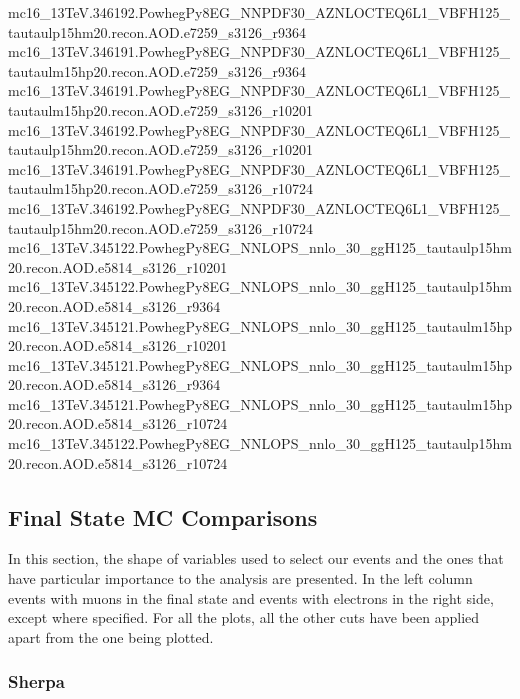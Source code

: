 {mc16\_13TeV.346192.PowhegPy8EG\_NNPDF30\_AZNLOCTEQ6L1\_VBFH125\_tautaulp15hm20.recon.AOD.e7259\_s3126\_r9364\newline  
mc16\_13TeV.346191.PowhegPy8EG\_NNPDF30\_AZNLOCTEQ6L1\_VBFH125\_tautaulm15hp20.recon.AOD.e7259\_s3126\_r9364\newline  
mc16\_13TeV.346191.PowhegPy8EG\_NNPDF30\_AZNLOCTEQ6L1\_VBFH125\_tautaulm15hp20.recon.AOD.e7259\_s3126\_r10201\newline  
mc16\_13TeV.346192.PowhegPy8EG\_NNPDF30\_AZNLOCTEQ6L1\_VBFH125\_tautaulp15hm20.recon.AOD.e7259\_s3126\_r10201\newline  
mc16\_13TeV.346191.PowhegPy8EG\_NNPDF30\_AZNLOCTEQ6L1\_VBFH125\_tautaulm15hp20.recon.AOD.e7259\_s3126\_r10724\newline  
mc16\_13TeV.346192.PowhegPy8EG\_NNPDF30\_AZNLOCTEQ6L1\_VBFH125\_tautaulp15hm20.recon.AOD.e7259\_s3126\_r10724\newline  
mc16\_13TeV.345122.PowhegPy8EG\_NNLOPS\_nnlo\_30\_ggH125\_tautaulp15hm20.recon.AOD.e5814\_s3126\_r10201\newline  
mc16\_13TeV.345122.PowhegPy8EG\_NNLOPS\_nnlo\_30\_ggH125\_tautaulp15hm20.recon.AOD.e5814\_s3126\_r9364\newline  
mc16\_13TeV.345121.PowhegPy8EG\_NNLOPS\_nnlo\_30\_ggH125\_tautaulm15hp20.recon.AOD.e5814\_s3126\_r10201\newline  
mc16\_13TeV.345121.PowhegPy8EG\_NNLOPS\_nnlo\_30\_ggH125\_tautaulm15hp20.recon.AOD.e5814\_s3126\_r9364\newline  
mc16\_13TeV.345121.PowhegPy8EG\_NNLOPS\_nnlo\_30\_ggH125\_tautaulm15hp20.recon.AOD.e5814\_s3126\_r10724\newline  
mc16\_13TeV.345122.PowhegPy8EG\_NNLOPS\_nnlo\_30\_ggH125\_tautaulp15hm20.recon.AOD.e5814\_s3126\_r10724}	

\clearpage
\subsection{Final State MC Comparisons}\label{DistComparisons}
In this section, the shape of variables used to select our events and the ones that have particular importance to the analysis are presented. In the left column events with muons in the final state and events with electrons in the right side, except where specified. For all the plots, all the other cuts have been applied apart from the one being plotted.
\subsubsection{Sherpa}


